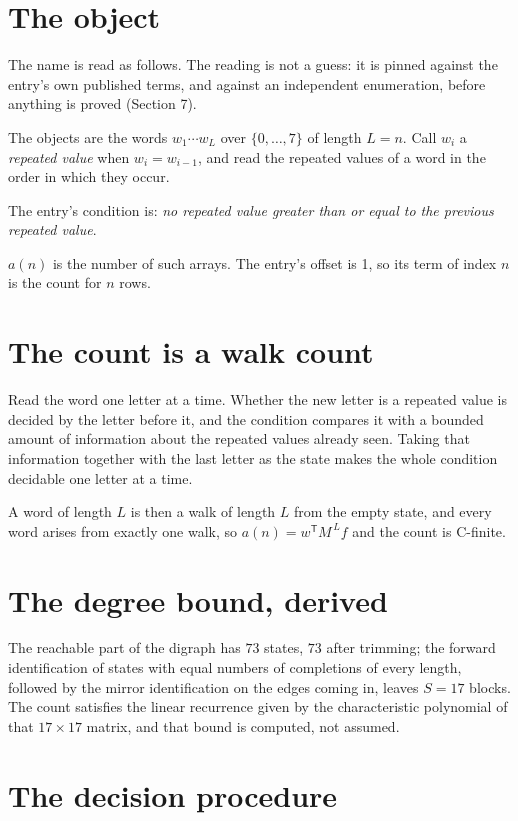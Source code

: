 \documentclass[11pt]{article}
\theoremstyle{definition}
\begin{document}
\section{The object}

The name is read as follows. The reading is not a guess: it is pinned against the entry's own published terms, and against an independent enumeration, before anything is proved (Section 7).

The objects are the words $w_1\cdots w_L$ over $\{0,\dots,7\}$ of length $L = n$. Call $w_i$ a {\itshape repeated value} when $w_i = w_{i-1}$, and read the repeated values of a word in the order in which they occur.

The entry's condition is: {\itshape no repeated value greater than or equal to the previous repeated value}.

$a(n)$ is the number of such arrays. The entry's offset is 1, so its term of index $n$ is the count for $n$ rows.

\section{The count is a walk count}

Read the word one letter at a time. Whether the new letter is a repeated value is decided by the letter before it, and the condition compares it with a bounded amount of information about the repeated values already seen. Taking that information together with the last letter as the state makes the whole condition decidable one letter at a time.

A word of length $L$ is then a walk of length $L$ from the empty state, and every word arises from exactly one walk, so $a(n) = w^{\mathsf T}M^{\,L}f$ and the count is C-finite.

\section{The degree bound, derived}

The reachable part of the digraph has $73$ states, $73$ after trimming; the forward identification of states with equal numbers of completions of every length, followed by the mirror identification on the edges coming in, leaves $S = 17$ blocks. The count satisfies the linear recurrence given by the characteristic polynomial of that $17\times17$ matrix, and that bound is computed, not assumed.

\section{The decision procedure}
\end{document}
